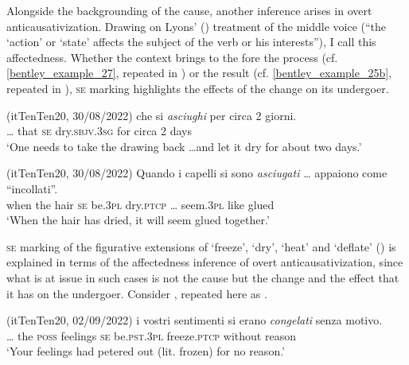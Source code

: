 \documentclass[output=paper,colorlinks,citecolor=brown
]{langscibook}
\begin{document}
Alongside the backgrounding of the cause, another inference arises in overt anticausativization. Drawing on Lyons’ (\citeyear[373]{lyons1969introduction}) treatment of the middle voice (“the ‘action’ or ‘state’ affects the subject of the verb or his interests”), I call this affectedness. Whether the context brings to the fore the process (cf. \ref{bentley_example_27}, repeated in ) or the result (cf. \ref{bentley_example_25b}, repeated in ), \textsc{se} marking highlights the effects of the change on its undergoer. 

\hspace*{\fill}(itTenTen20, 30/08/2022)\quad
\ea \label{bentley_example_55}
 che		si		\textit{asciughi}					per		circa	2	giorni. \\
	{\ldots} that	\textsc{se}		dry.\textsc{sbjv}.3\textsc{sg}		for		circa	2	days \\
\glt 			‘One needs to take the drawing back \ldots  and let it dry for about two days.’
\z

\hspace*{\fill}(itTenTen20, 30/08/2022)\quad
\ea \label{bentley_example_56} 
\gll Quando		i			capelli	si		sono 		\textit{asciugati}  {\ldots }	appaiono		come “incollati”. \\
	when				the	hair			\textsc{se}		be.3\textsc{pl}	dry.\textsc{ptcp}	{\ldots}					seem.3\textsc{pl}		like			glued  \\
\glt 			‘When the hair has dried, it will seem glued together.’
\z

\textsc{se} marking of the figurative extensions of ‘freeze’, ‘dry’, ‘heat’ and ‘deflate’ () is explained in terms of the affectedness inference of overt anticausativization, since what is at issue in such cases is not the cause but the change and the effect that it has on the undergoer. Consider , repeated here as . 

\hspace*{\fill}(itTenTen20, 02/09/2022)\quad
\ea \label{bentley_example_57}
\gll  {\ldots}  i			vostri		sentimenti		si		erano 				\textit{congelati}		senza			motivo.  \\
	{\ldots} 	the	\textsc{poss}			feelings				\textsc{se}		be.\textsc{pst}.3\textsc{pl}	freeze.\textsc{ptcp}	without	reason	 \\
\glt 			‘Your feelings had petered out (lit. frozen) for no reason.’	
\z
\end{document}
